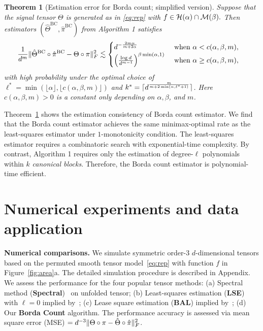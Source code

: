 \documentclass{article}
\newtheorem{thm}{Theorem}
\theoremstyle{definition}
\begin{document}
\begin{thm}[Estimation error for Borda count; simplified version]\label{thm:BC}
Suppose that the signal tensor $\Theta$ is generated as in \eqref{eq:rep} with $f\in\mathcal{H}(\alpha)\cap \mathcal{M}(\beta).$
Then estimators $(\hat\Theta^{\text{BC}},\hat\pi^{\text{BC}})$ from Algorithm 1 satisfies
\begin{align}\label{eq:BC}
   \frac{1}{d^m}&\lVert\hat\Theta^{\textup{BC}}\circ\hat\pi^{\textup{BC}}-\Theta\circ \pi\rVert_F^2\lesssim 
    \begin{cases}d^{-{2m\alpha\over m+2\alpha}} & \text{ when } \alpha <c(\alpha,\beta,m),\\
    \left({\log d\over d^{m-1}}\right)^{\beta\min(\alpha,1)}&\text{ when } \alpha \geq c(\alpha,\beta,m),
    \end{cases}
\end{align}
with high probability under the optimal choice of $\ell^* = \min(\lfloor\alpha\rfloor,\lfloor c(\alpha,\beta,m)\rfloor)$ and $k^* = \lceil d^{m\over m+2\min(\alpha,\ell^*+1)}\rceil$.  Here $c(\alpha,\beta,m)>0$ is a constant only depending on $\alpha,\beta$,  and $m$.
\end{thm}
Theorem~\ref{thm:BC} shows the estimation consistency of Borda count estimator. We find that the Borda count estimator achieves the same minimax-optimal rate as the least-squares estimator under $1$-monotonicity condition. The least-squares estimator requires a combinatoric search with exponential-time complexity. By contrast, Algorithm 1 requires only the estimation of degree-$\ell$ polynomials within $k$ \emph{canonical blocks}. Therefore, the Borda count estimator is polynomial-time efficient. 



\section{Numerical experiments and data application}\label{sec:sim}
\vspace{-.1cm}
{\bf Numerical comparisons.} We simulate symmetric order-3 $d$-dimensional tensors based on the permuted smooth tensor model~\eqref{eq:rep} with function $f$ in Figure~\ref{fig:area}a. The detailed simulation procedure is described in Appendix. We assess the performance for the four popular tensor methods: (a) Spectral method ({\bf \small Spectral})~\citep{xu2018rates} on unfolded tensor; (b) Least-squares estimation ({\bf \small LSE})  with $\ell=0$ implied by~\citep{gao2021minimax}; (c) Lease square estimation ({\bf \small BAL}) implied by~\cite{balasubramanian2021nonparametric}; (d) Our {\bf \small Borda Count} algorithm. The performance accuracy is assessed via mean square error (MSE) $= d^{-3}\lVert\Theta\circ\pi-\hat\Theta\circ\hat\pi\rVert_F^2$. 
\end{document}
